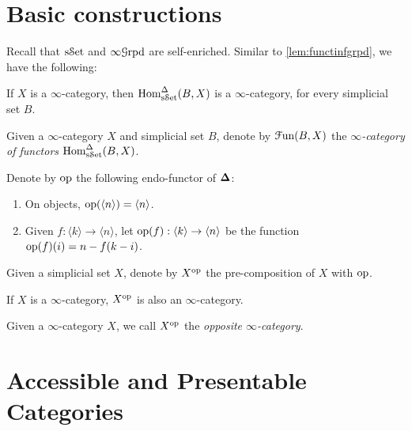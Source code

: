 \documentclass[10pt]{amsart}
\numberwithin{equation}{section}
\begin{document}
\section{Basic constructions}

Recall that $\mathrm{s}\mathcal{S}\mathrm{et}$ and $\infty\mathcal{G}\mathrm{rpd}$ are self-enriched. Similar to \cref{lem:functinfgrpd}, we have the following: 
\begin{lemma}
  If $X$ is a $\infty$-category, then $\mathrm{Hom}_{\mathrm{s}\mathcal{S}\mathrm{et}}^\Delta(B,X)$ is a $\infty$-category, for every simplicial set $B$. 
\end{lemma}
\begin{definition}
  Given a $\infty$-category $X$ and simplicial set $B$, denote by $\mathcal{F}\mathrm{un}(B,X)$ the \emph{$\infty$-category of functors} $\mathrm{Hom}_{\mathrm{s}\mathcal{S}\mathrm{et}}^\Delta(B,X)$. 
\end{definition}
\begin{definition}
  Denote by $\mathrm{op}$ the following endo-functor of $\bm{\Delta}$: 
  \begin{enumerate}
    \item On objects,  $\mathrm{op}(\langle n\rangle)=\langle n\rangle$. 
    \item Given $f:\langle k\rangle\to\langle n\rangle$, let $\mathrm{op}(f):\langle k\rangle\to\langle n\rangle$ be the function $\mathrm{op}(f)(i)=n-f(k-i)$. 
  \end{enumerate}Given a simplicial set $X$, denote by $X^{\mathrm{op}}$ the pre-composition of $X$ with $\mathrm{op}$. 
\end{definition}
\begin{lemma}
  If $X$ is a $\infty$-category, $X^{\mathrm{op}}$ is also an $\infty$-category. 
\end{lemma}
\begin{definition}
  Given a $\infty$-category $X$, we call $X^{\mathrm{op}}$ the \emph{opposite $\infty$-category}.  
\end{definition}

\section{Accessible and Presentable Categories}
\end{document}

